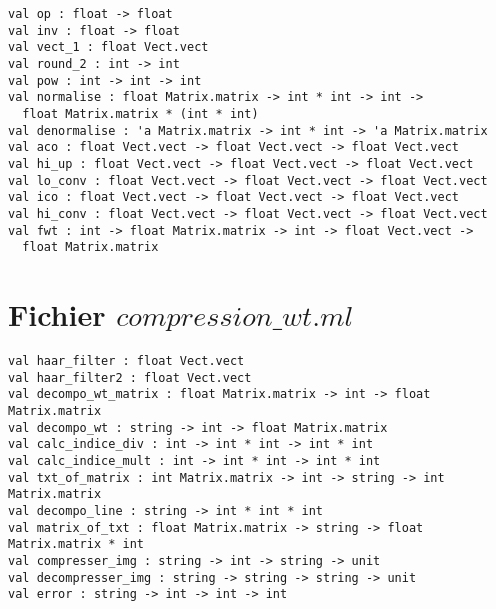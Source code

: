 \documentclass[a4paper,10pt]{article}
\begin{document}
    \begin{verbatim}
val op : float -> float
val inv : float -> float
val vect_1 : float Vect.vect
val round_2 : int -> int
val pow : int -> int -> int
val normalise : float Matrix.matrix -> int * int -> int -> 
  float Matrix.matrix * (int * int)
val denormalise : 'a Matrix.matrix -> int * int -> 'a Matrix.matrix
val aco : float Vect.vect -> float Vect.vect -> float Vect.vect
val hi_up : float Vect.vect -> float Vect.vect -> float Vect.vect
val lo_conv : float Vect.vect -> float Vect.vect -> float Vect.vect
val ico : float Vect.vect -> float Vect.vect -> float Vect.vect
val hi_conv : float Vect.vect -> float Vect.vect -> float Vect.vect
val fwt : int -> float Matrix.matrix -> int -> float Vect.vect -> 
  float Matrix.matrix
    \end{verbatim}
    
  \section*{Fichier $compression\_wt.ml$}
  
    \begin{verbatim}
val haar_filter : float Vect.vect
val haar_filter2 : float Vect.vect
val decompo_wt_matrix : float Matrix.matrix -> int -> float Matrix.matrix
val decompo_wt : string -> int -> float Matrix.matrix
val calc_indice_div : int -> int * int -> int * int
val calc_indice_mult : int -> int * int -> int * int
val txt_of_matrix : int Matrix.matrix -> int -> string -> int Matrix.matrix
val decompo_line : string -> int * int * int
val matrix_of_txt : float Matrix.matrix -> string -> float Matrix.matrix * int
val compresser_img : string -> int -> string -> unit
val decompresser_img : string -> string -> string -> unit
val error : string -> int -> int -> int
    \end{verbatim}
\end{document}
